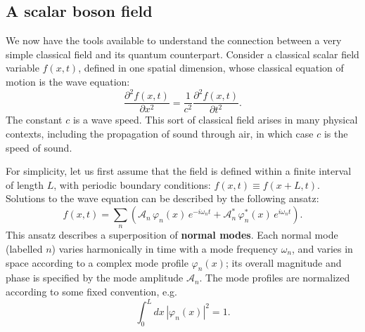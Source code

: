 \documentclass[pra,12pt]{revtex4}
\begin{document}
\subsection{A scalar boson field}

We now have the tools available to understand the connection between a
very simple classical field and its quantum counterpart.  Consider a
classical scalar field variable $f(x,t)$, defined in one spatial
dimension, whose classical equation of motion is the wave equation:
\begin{equation}
  \frac{\partial^2\! f(x,t)}{\partial x^2}
  = \frac{1}{c^2} \frac{\partial^2\! f(x,t)}{\partial t^2}.
  \label{waveeqn}
\end{equation}
The constant $c$ is a wave speed.  This sort of classical field arises
in many physical contexts, including the propagation of sound through
air, in which case $c$ is the speed of sound.

For simplicity, let us first assume that the field is defined within a
finite interval of length $L$, with periodic boundary conditions:
$f(x,t) \equiv f(x+L, t)$.  Solutions to the wave equation can be
described by the following ansatz:
\begin{equation}
  f(x,t) = \sum_n \left( \mathcal{A}_n\, \varphi_n(x) \, e^{-i\omega_n t}
  + \mathcal{A}_n^*\, \varphi_n^*(x) \, e^{i\omega_n t}\right).
  \label{fnorm}
\end{equation}
This ansatz describes a superposition of \textbf{normal modes}.  Each
normal mode (labelled $n$) varies harmonically in time with a mode
frequency $\omega_n$, and varies in space according to a complex mode
profile $\varphi_n(x)$; its overall magnitude and phase is specified
by the mode amplitude $\mathcal{A}_n$.  The mode profiles are
normalized according to some fixed convention, e.g.
\begin{equation}
  \int_0^L dx \, |\varphi_n(x)|^2 = 1.
\end{equation}
\end{document}
